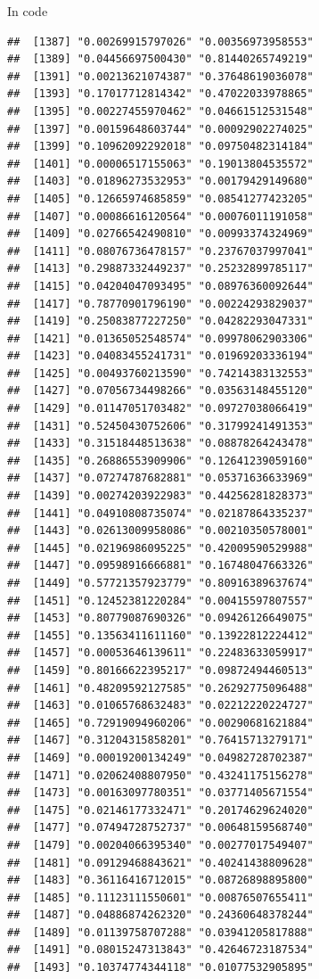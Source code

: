 \documentclass[ignorenonframetext,]{beamer}
\begin{document}
\begin{frame}[fragile]{In code}
\begin{verbatim}
##  [1387] "0.00269915797026" "0.00356973958553"
##  [1389] "0.04456697500430" "0.81440265749219"
##  [1391] "0.00213621074387" "0.37648619036078"
##  [1393] "0.17017712814342" "0.47022033978865"
##  [1395] "0.00227455970462" "0.04661512531548"
##  [1397] "0.00159648603744" "0.00092902274025"
##  [1399] "0.10962092292018" "0.09750482314184"
##  [1401] "0.00006517155063" "0.19013804535572"
##  [1403] "0.01896273532953" "0.00179429149680"
##  [1405] "0.12665974685859" "0.08541277423205"
##  [1407] "0.00086616120564" "0.00076011191058"
##  [1409] "0.02766542490810" "0.00993374324969"
##  [1411] "0.08076736478157" "0.23767037997041"
##  [1413] "0.29887332449237" "0.25232899785117"
##  [1415] "0.04204047093495" "0.08976360092644"
##  [1417] "0.78770901796190" "0.00224293829037"
##  [1419] "0.25083877227250" "0.04282293047331"
##  [1421] "0.01365052548574" "0.09978062903306"
##  [1423] "0.04083455241731" "0.01969203336194"
##  [1425] "0.00493760213590" "0.74214383132553"
##  [1427] "0.07056734498266" "0.03563148455120"
##  [1429] "0.01147051703482" "0.09727038066419"
##  [1431] "0.52450430752606" "0.31799241491353"
##  [1433] "0.31518448513638" "0.08878264243478"
##  [1435] "0.26886553909906" "0.12641239059160"
##  [1437] "0.07274787682881" "0.05371636633969"
##  [1439] "0.00274203922983" "0.44256281828373"
##  [1441] "0.04910808735074" "0.02187864335237"
##  [1443] "0.02613009958086" "0.00210350578001"
##  [1445] "0.02196986095225" "0.42009590529988"
##  [1447] "0.09598916666881" "0.16748047663326"
##  [1449] "0.57721357923779" "0.80916389637674"
##  [1451] "0.12452381220284" "0.00415597807557"
##  [1453] "0.80779087690326" "0.09426126649075"
##  [1455] "0.13563411611160" "0.13922812224412"
##  [1457] "0.00053646139611" "0.22483633059917"
##  [1459] "0.80166622395217" "0.09872494460513"
##  [1461] "0.48209592127585" "0.26292775096488"
##  [1463] "0.01065768632483" "0.02212220224727"
##  [1465] "0.72919094960206" "0.00290681621884"
##  [1467] "0.31204315858201" "0.76415713279171"
##  [1469] "0.00019200134249" "0.04982728702387"
##  [1471] "0.02062408807950" "0.43241175156278"
##  [1473] "0.00163097780351" "0.03771405671554"
##  [1475] "0.02146177332471" "0.20174629624020"
##  [1477] "0.07494728752737" "0.00648159568740"
##  [1479] "0.00204066395340" "0.00277017549407"
##  [1481] "0.09129468843621" "0.40241438809628"
##  [1483] "0.36116416712015" "0.08726898895800"
##  [1485] "0.11123111550601" "0.00876507655411"
##  [1487] "0.04886874262320" "0.24360648378244"
##  [1489] "0.01139758707288" "0.03941205817888"
##  [1491] "0.08015247313843" "0.42646723187534"
##  [1493] "0.10374774344118" "0.01077532905895"

\end{verbatim}
\end{frame}
\end{document}
